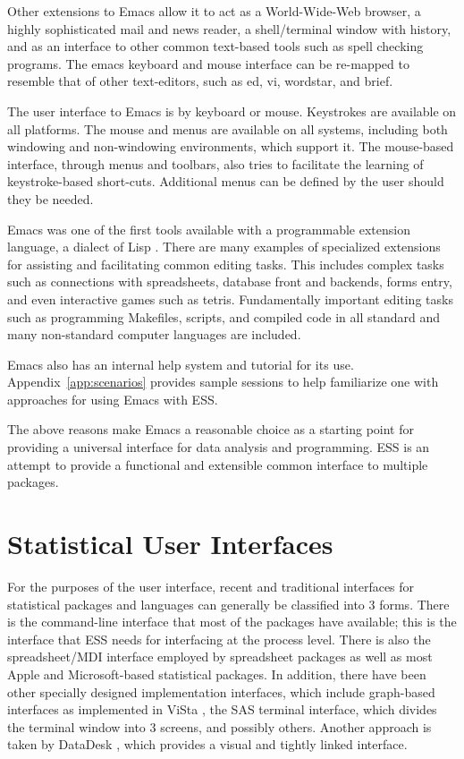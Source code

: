 \documentclass{article}
\begin{document}
Other extensions to Emacs allow it to act as a World-Wide-Web browser,
a highly sophisticated mail and news reader, a shell/terminal window
with history, and as an interface to other common text-based tools
such as spell checking programs.  The emacs keyboard and mouse interface can
be re-mapped
to resemble that of other text-editors, such as ed, vi, wordstar, and
brief.  

The user interface to Emacs is by keyboard or mouse.  
Keystrokes are available on all platforms.  The mouse and menus are available
on all systems, including both windowing and
non-windowing environments,  which support it.  The mouse-based interface, through menus
and toolbars, also tries to facilitate the learning of keystroke-based
short-cuts.  
Additional menus can be defined by the user should they be needed.

Emacs was one of the first tools available with a programmable
extension language, a dialect of Lisp
\citep{RChassell1999,PGraham:1996}.  There are many examples of
specialized extensions for assisting and facilitating common editing
tasks.  This includes complex tasks such as connections with
spreadsheets, database front and backends, forms entry, and even
interactive games such as tetris.    Fundamentally important editing
tasks such as
programming Makefiles, scripts, and compiled code in all standard and many
non-standard computer languages are included.

Emacs also has an internal help system and tutorial for its use.
Appendix~\ref{app:scenarios} provides sample sessions to help
familiarize one with approaches for using Emacs with ESS.

The above reasons make Emacs a reasonable choice as a starting point
for providing a universal interface for data analysis and programming.
ESS is an attempt to provide a functional and extensible common
interface to multiple packages.

\section{Statistical User Interfaces}
\label{sec:UI}

For the purposes of the user interface, recent and traditional
interfaces for statistical packages and languages can generally be
classified into 3 forms.  There is the command-line interface that
most of the packages have available; this is the interface that ESS
needs for interfacing at the process level.  There is also the
spreadsheet/MDI interface employed by  spreadsheet packages as
well as most Apple and Microsoft-based statistical packages.  In
addition, there have been other specially designed implementation interfaces,
which include graph-based interfaces as implemented in ViSta
\citep{youn:lubi:1995}, the SAS terminal interface, which divides the
terminal window into 3 screens, and possibly others.  Another approach
is taken by DataDesk \citep{vell:prat:1989}, which provides a visual
and tightly linked interface.
\end{document}
